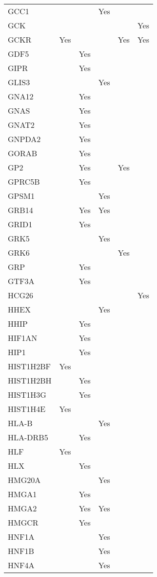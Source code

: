 \documentclass[]{report}
\begin{document}
\begin{appendices}
\begin{longtable}[t]{llllll}
GCC1 &  &  & Yes &  & \\
GCK &  &  &  &  & Yes\\
GCKR & Yes &  &  & Yes & Yes\\
GDF5 &  & Yes &  &  & \\
GIPR &  & Yes &  &  & \\
GLIS3 &  &  & Yes &  & \\
GNA12 &  & Yes &  &  & \\
GNAS &  & Yes &  &  & \\
GNAT2 &  & Yes &  &  & \\
GNPDA2 &  & Yes &  &  & \\
GORAB &  & Yes &  &  & \\
GP2 &  & Yes &  & Yes & \\
GPRC5B &  & Yes &  &  & \\
GPSM1 &  &  & Yes &  & \\
GRB14 &  & Yes & Yes &  & \\
GRID1 &  & Yes &  &  & \\
GRK5 &  &  & Yes &  & \\
GRK6 &  &  &  & Yes & \\
GRP &  & Yes &  &  & \\
GTF3A &  & Yes &  &  & \\
HCG26 &  &  &  &  & Yes\\
HHEX &  &  & Yes &  & \\
HHIP &  & Yes &  &  & \\
HIF1AN &  & Yes &  &  & \\
HIP1 &  & Yes &  &  & \\
HIST1H2BF & Yes &  &  &  & \\
HIST1H2BH &  & Yes &  &  & \\
HIST1H3G &  & Yes &  &  & \\
HIST1H4E & Yes &  &  &  & \\
HLA-B &  &  & Yes &  & \\
HLA-DRB5 &  & Yes &  &  & \\
HLF & Yes &  &  &  & \\
HLX &  & Yes &  &  & \\
HMG20A &  &  & Yes &  & \\
HMGA1 &  & Yes &  &  & \\
HMGA2 &  & Yes & Yes &  & \\
HMGCR &  & Yes &  &  & \\
HNF1A &  &  & Yes &  & \\
HNF1B &  &  & Yes &  & \\
HNF4A &  &  & Yes &  & \\

\end{longtable}
\end{appendices}
\end{document}
